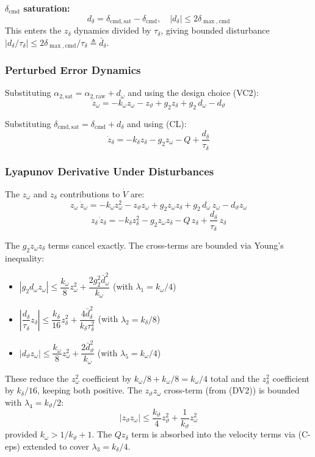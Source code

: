 \documentclass[11pt,a4paper]{article}
\theoremstyle{plain}
\theoremstyle{remark}
\newcommand{\vth}{\vartheta}
\newcommand{\zth}{z_{\vth}}
\newcommand{\zom}{z_{\omega}}
\newcommand{\zdel}{z_{\delta}}
\newcommand{\dcmd}{\delta_{\mathrm{cmd}}}
\begin{document}
\textbf{$\dcmd$ saturation:}
\begin{equation}
  d_\delta = \delta_{\mathrm{cmd},\mathrm{sat}} - \dcmd, \quad |d_\delta| \leq 2\delta_{\max,\mathrm{cmd}}
\end{equation}
This enters the $\zdel$ dynamics divided by $\tau_\delta$, giving bounded disturbance $|d_\delta/\tau_\delta| \leq 2\delta_{\max,\mathrm{cmd}}/\tau_\delta \triangleq \bar{d}_\delta$.

\subsubsection{Perturbed Error Dynamics}

Substituting $\alpha_{2,\mathrm{sat}} = \alpha_{2,\mathrm{raw}} + d_\omega$ and using the design choice (VC2):
\[
  \dot\zom = -k_\omega\zom - \zth + g_2\zdel + g_2\,d_\omega - d_\vartheta
\]

Substituting $\delta_{\mathrm{cmd},\mathrm{sat}} = \dcmd + d_\delta$ and using (CL):
\[
  \dot\zdel = -k_\delta\zdel - g_2\zom - Q + \frac{d_\delta}{\tau_\delta}
\]

\subsubsection{Lyapunov Derivative Under Disturbances}

The $z_\omega$ and $z_\delta$ contributions to $\dot V$ are:
\[
  \zom\,\dot\zom = -k_\omega\zom^2 - \zth\zom + g_2\zom\zdel + g_2\,d_\omega\,\zom - d_\vartheta\zom
\]
\[
  \zdel\,\dot\zdel = -k_\delta\zdel^2 - g_2\zom\zdel - Q\,\zdel + \frac{d_\delta}{\tau_\delta}\,\zdel
\]

The $g_2\zom\zdel$ terms cancel exactly. The cross-terms are bounded via Young's inequality:
\begin{itemize}
  \item $|g_2 d_\omega\zom| \leq \dfrac{k_\omega}{8}\zom^2 + \dfrac{2g_2^2\bar{d}_\omega^2}{k_\omega}$ \quad (with $\lambda_1 = k_\omega/4$)
  \item $\left|\dfrac{d_\delta}{\tau_\delta}\zdel\right| \leq \dfrac{k_\delta}{16}\zdel^2 + \dfrac{4\bar{d}_\delta^2}{k_\delta\tau_\delta^2}$ \quad (with $\lambda_2 = k_\delta/8$)
  \item $|d_\vartheta\zom| \leq \dfrac{k_\omega}{8}\zom^2 + \dfrac{2\bar{d}_\vartheta^2}{k_\omega}$ \quad (with $\lambda_5 = k_\omega/4$)
\end{itemize}

These reduce the $\zom^2$ coefficient by $k_\omega/8 + k_\omega/8 = k_\omega/4$ total and the $\zdel^2$ coefficient by $k_\delta/16$, keeping both positive. The $\zth\zom$ cross-term (from (DV2)) is bounded with $\lambda_4 = k_\vth/2$:
\[
  |\zth\zom| \leq \frac{k_\vth}{4}\zth^2 + \frac{1}{k_\vth}\zom^2
\]
provided $k_\omega > 1/k_\vth + 1$. The $Q\zdel$ term is absorbed into the velocity terms via (C-eps) extended to cover $\lambda_3 = k_\delta/4$.
\end{document}
